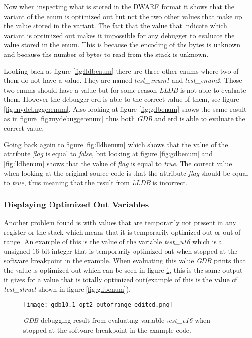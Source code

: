 Now when inspecting what is stored in the \gls{DWARF} format it shows that the variant of the enum is optimized out but not the two other values that make up the value stored in the variant.
The fact that the value that indicate which variant is optimized out makes it impossible for any debugger to evaluate the value stored in the enum.
This is because the encoding of the bytes is unknown and because the number of bytes to read from the stack is unknown.


Looking back at figure \ref{fig:lldbenum} there are three other enums where two of them do not have a value.
They are named \emph{test\_enum1} and \emph{test\_enum2}.
Those two enums should have a value but for some reason \emph{LLDB} is not able to evaluate them.
However the debugger \gls{erd} is able to the correct value of them, see figure \ref{fig:mydebuggerenum}.
Also looking at figure \ref{fig:gdbenum} shows the same result as in figure \ref{fig:mydebuggerenum} thus both \emph{GDB} and \gls{erd} is able to evaluate the correct value.


Going back again to figure \ref{fig:lldbenum} which shows that the value of the attribute \emph{flag} is equal to \emph{false}, but looking at figure \ref{fig:gdbenum} and \ref{fig:lldbenum} shows that the value of \emph{flag} is equal to \emph{true}.
The correct value when looking at the original source code is that the attribute \emph{flag} should be equal to \emph{true}, thus meaning that the result from \emph{LLDB} is incorrect.



\subsubsection{Displaying Optimized Out Variables}
Another problem found is with values that are temporarily not present in any register or the stack which means that it is temporarily optimized out or out of range.
An example of this is the value of the variable \emph{test\_u16} which is a unsigned $16$ bit integer that is temporarily optimized out when stopped at the software breakpoint in the example.
When evaluating this value \emph{GDB} prints that the value is optimized out which can be seen in figure \ref{fig:gdboutofrange}, this is the same output it gives for a value that is totally optimized out(example of this is the value of \emph{test\_struct} shown in figure \ref{fig:gdbenum}).


\begin{figure}[h]
	\centering
	\texttt{[image: gdb10.1-opt2-outofrange-edited.png]}
	\caption{\emph{GDB} debugging result from evaluating variable \emph{test\_u16} when stopped at the software breakpoint in the example code.}
	\label{fig:gdboutofrange}
\end{figure}



